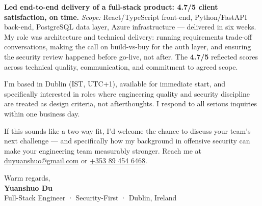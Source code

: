 \documentclass{coverletter}
\begin{document}
{  \vspace{0.12cm}

  \textbf{Led end-to-end delivery of a full-stack product: \textbf{4.7/5 client satisfaction}, on time.}
  \textit{Scope:} React/TypeScript front-end, Python/FastAPI back-end, PostgreSQL
  data layer, Azure infrastructure — delivered in six weeks. My role was architecture
  and technical delivery: running requirements trade-off conversations,
  making the call on build-vs-buy for the auth layer, and ensuring the security review
  happened before go-live, not after. The \textbf{4.7/5} reflected scores across
  technical quality, communication, and commitment to agreed scope.
}

\vspace{0.3cm}

\noindent%
{\color{secondary}\sffamily\small
     
    
    
    
    
}

\vspace{0.3cm}

\noindent%
{\color{secondary}\sffamily\small
  I'm based in Dublin (IST, UTC+1), available for immediate start, and specifically
  interested in roles where engineering quality and security discipline are treated
  as design criteria, not afterthoughts. I respond to all serious inquiries within
  one business day.

  If this sounds like a two-way fit, I'd welcome the chance to discuss your team's
  next challenge — and specifically how my background in offensive security can
  make your engineering team measurably stronger. Reach me at
  \href{https://mail.google.com/mail/?view=cm&to=duyuanshuo@gmail.com}{\color{accent}duyuanshuo@gmail.com}
  or \href{tel:+353894546468}{\color{accent}+353 89 454 6468}.
}

\vspace{0.3cm}

\noindent%
{\color{secondary}\sffamily\small Warm regards,}\\[0.25cm]
{\sffamily\bfseries\Large\color{namecolor} Yuanshuo Du}\\[0.05cm]
{\sffamily\small\color{muted} Full-Stack Engineer · Security-First · Dublin, Ireland}
\end{document}
